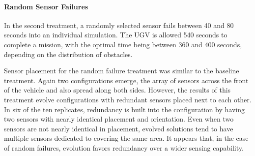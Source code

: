 \paragraph{Random Sensor Failures}
In the second treatment, a randomly
selected sensor fails between 40 and 80 seconds into an individual simulation.
%
The UGV is allowed 540 seconds to complete a mission,
with the optimal time being between 360 and 400 seconds,
depending on the distribution of obstacles. 
%
%



Sensor placement for the random failure treatment was similar to the baseline treatment.  
%
Again two configurations emerge, the array of sensors across the front of the vehicle and
also spread along both sides. 
%
However, the results of this treatment evolve configurations with redundant sensors
 placed next to each other. 
%
In six of the ten replicates, redundancy is built into the configuration by having two sensors with nearly identical placement and orientation. 
%
Even when two sensors are not nearly identical in placement, evolved solutions tend to have multiple sensors dedicated to covering the same area.  
%
It appears that,  in the case of random failures, evolution favors redundancy over a wider sensing capability.

